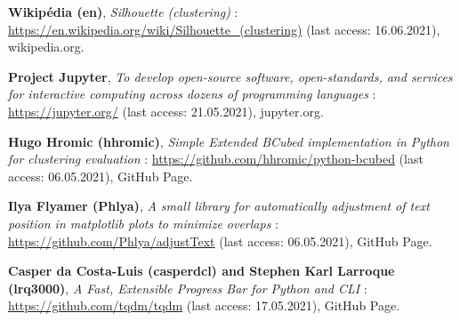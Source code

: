 \begin{thebibliography}{9}
\textbf{Wikipédia (en)},
\textit{Silhouette (clustering)} : \url{https://en.wikipedia.org/wiki/Silhouette_(clustering)} (last access: 16.06.2021),
wikipedia.org.

\textbf{Project Jupyter},
\textit{To develop open-source software, open-standards, and services for interactive computing across dozens of programming languages} : \url{https://jupyter.org/} (last access: 21.05.2021),
jupyter.org.

\textbf{Hugo Hromic (hhromic)},
\textit{Simple Extended BCubed implementation in Python for clustering evaluation} : \url{https://github.com/hhromic/python-bcubed} (last access: 06.05.2021),
GitHub Page.

\textbf{Ilya Flyamer (Phlya)},
\textit{A small library for automatically adjustment of text position in matplotlib plots to minimize overlaps} : \url{https://github.com/Phlya/adjustText} (last access: 06.05.2021),
GitHub Page.

\textbf{Casper da Costa-Luis (casperdcl) and Stephen Karl Larroque (lrq3000)},
\textit{A Fast, Extensible Progress Bar for Python and CLI} : \url{https://github.com/tqdm/tqdm} (last access: 17.05.2021),
GitHub Page.

\end{thebibliography}

